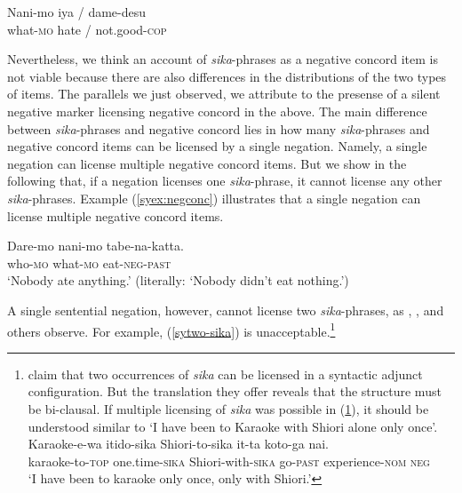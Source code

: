 \documentclass[output=paper]{langscibook}
\begin{document}
\ea \label{syex:dame}
   \gll Nani-mo iya / dame-desu\\
   what-\textsc{mo} hate / not.good-\textsc{cop}\\\z

Nevertheless, we think an account of \emph{sika}-phrases as a negative concord item is not viable because there are also differences in the distributions of the two types of items.  
The parallels we just observed, we attribute to the presense of a silent negative marker licensing negative concord in the above.
The main difference between \emph{sika}-phrases and negative concord lies in how many \emph{sika}-phrases and  negative concord items can be licensed by a single negation. Namely, a single negation can license multiple negative concord items.  
But we show in the following that, if a negation licenses one \emph{sika}-phrase, it cannot license any other \emph{sika}-phrases.  
Example (\ref{syex:negconc}) illustrates that a single negation can license multiple negative concord items.

\ea \label{syex:negconc}
 \gll Dare-mo nani-mo tabe-na-katta.\\
who-\textsc{mo} what-\textsc{mo} eat-\textsc{neg}-\textsc{past}\\
\glt `Nobody ate anything.' (literally: `Nobody didn't eat nothing.')\z

A single sentential negation, however, cannot license two \emph{sika}-phrases, as \citet{aoyagi94}, \citet{kawahara08a}, \citet{miyagawa16a} and others observe.  
For example, (\ref{sytwo-sika}) is unacceptable.\footnote{\citet[(28b)]{miyagawa16a} claim that two occurrences of \emph{sika} can be licensed in a syntactic adjunct configuration.  But the translation they offer reveals that the structure must be bi-clausal.  If multiple licensing of \emph{sika} was possible in (\ref{syex:miyag}), it should be understood similar to `I have been to Karaoke with Shiori alone only once'.
\ea \label{syex:miyag}
\gll Karaoke-e-wa itido-sika Shiori-to-sika it-ta koto-ga nai.\\ karaoke-to-\textsc{top} one.time-\textsc{sika} Shiori-with-\textsc{sika} go-\textsc{past} experience-\textsc{nom} \textsc{neg}\\
\glt ‘I have been to karaoke only once, only with Shiori.’ 
\z
}

\z
\end{document}
